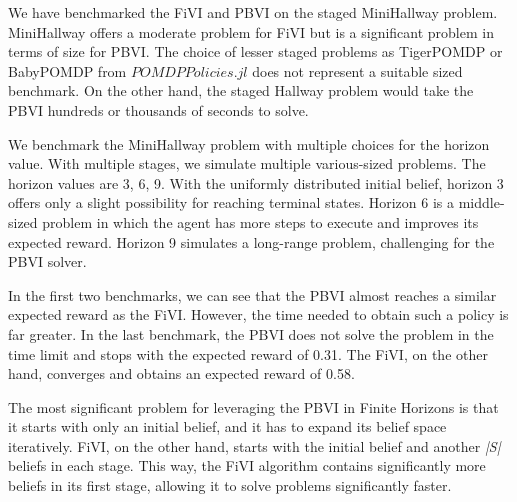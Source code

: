 We have benchmarked the FiVI and PBVI on the staged MiniHallway problem. MiniHallway offers a moderate problem for FiVI but is a significant problem in terms of size for PBVI. The choice of lesser staged problems as TigerPOMDP or BabyPOMDP from $POMDPPolicies.jl$ does not represent a suitable sized benchmark. On the other hand, the staged Hallway problem would take the PBVI hundreds or thousands of seconds to solve. 

We benchmark the MiniHallway problem with multiple choices for the horizon value. With multiple stages, we simulate multiple various-sized problems. The horizon values are 3, 6, 9. With the uniformly distributed initial belief, horizon 3 offers only a slight possibility for reaching terminal states. Horizon 6 is a middle-sized problem in which the agent has more steps to execute and improves its expected reward. Horizon 9 simulates a long-range problem, challenging for the PBVI solver.

In the first two benchmarks, we can see that the PBVI almost reaches a similar expected reward as the FiVI. However, the time needed to obtain such a policy is far greater. In the last benchmark, the PBVI does not solve the problem in the time limit and stops with the expected reward of 0.31. The FiVI, on the other hand, converges and obtains an expected reward of 0.58.

The most significant problem for leveraging the PBVI in Finite Horizons is that it starts with only an initial belief, and it has to expand its belief space iteratively. FiVI, on the other hand, starts with the initial belief and another \textit{|S|} beliefs in each stage. This way, the FiVI algorithm contains significantly more beliefs in its first stage, allowing it to solve problems significantly faster.




